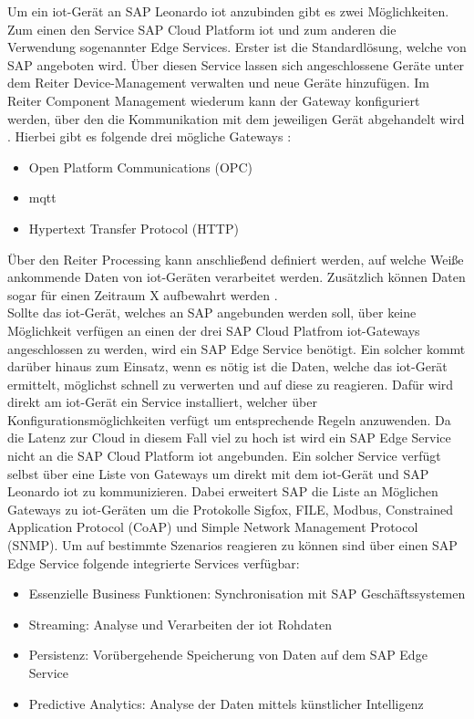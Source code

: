 \noindent Um ein \ac{iot}-Gerät an SAP Leonardo \ac{iot} anzubinden gibt es zwei Möglichkeiten. Zum einen den Service SAP Cloud Platform \ac{iot} und zum anderen die Verwendung sogenannter Edge Services. Erster ist die Standardlösung, welche von SAP angeboten wird. Über diesen Service lassen sich angeschlossene Geräte unter dem Reiter Device-Management verwalten und neue  Geräte hinzufügen. Im Reiter Component Management wiederum kann der Gateway konfiguriert werden, über den die Kommunikation mit dem jeweiligen Gerät abgehandelt wird \cite[Seite 200f]{Holtschulte20:IOS}. Hierbei gibt es folgende drei mögliche Gateways \cite[Seite 117]{Holtschulte20:IOS}:
\begin{itemize}
	\setlength{\itemsep}{1pt}
	\item{Open Platform Communications (OPC)}
	\item{\ac{mqtt}}
	\item{Hypertext Transfer Protocol (HTTP)}
\end{itemize}
Über den Reiter Processing kann anschließend definiert werden, auf welche Weiße ankommende Daten von \ac{iot}-Geräten verarbeitet werden. Zusätzlich können Daten sogar für einen Zeitraum X aufbewahrt werden \cite[Seite 205]{Holtschulte20:IOS}.\\
\noindent Sollte das \ac{iot}-Gerät, welches an SAP angebunden werden soll, über keine Möglichkeit verfügen an einen der drei SAP Cloud Platfrom \ac{iot}-Gateways angeschlossen zu werden, wird ein SAP Edge Service benötigt. Ein solcher kommt darüber hinaus zum Einsatz, wenn es nötig ist die Daten, welche das \ac{iot}-Gerät ermittelt, möglichst schnell zu verwerten und auf diese zu reagieren. Dafür wird direkt am \ac{iot}-Gerät ein Service installiert, welcher über Konfigurationsmöglichkeiten verfügt um entsprechende Regeln anzuwenden. Da die Latenz zur Cloud in diesem Fall viel zu hoch ist wird ein SAP Edge Service nicht an die SAP Cloud Platform \ac{iot} angebunden. Ein solcher Service verfügt selbst über eine Liste von Gateways um direkt mit dem \ac{iot}-Gerät und SAP Leonardo \ac{iot} zu kommunizieren. Dabei erweitert SAP die Liste an Möglichen Gateways zu \ac{iot}-Geräten um die Protokolle Sigfox, FILE, Modbus, Constrained Application Protocol (CoAP) und Simple Network Management Protocol (SNMP). Um auf bestimmte Szenarios reagieren zu können sind über einen SAP Edge Service folgende integrierte Services verfügbar\cite[Seite 229ff]{Holtschulte20:IOS}:
\begin{itemize}
	\setlength{\itemsep}{1pt}
	\item{Essenzielle Business Funktionen: Synchronisation mit SAP Geschäftssystemen}
	\item{Streaming: Analyse und Verarbeiten der \ac{iot} Rohdaten}
	\item{Persistenz: Vorübergehende Speicherung von Daten auf dem SAP Edge Service}
	\item{Predictive Analytics: Analyse der Daten mittels künstlicher Intelligenz}
\end{itemize}   

